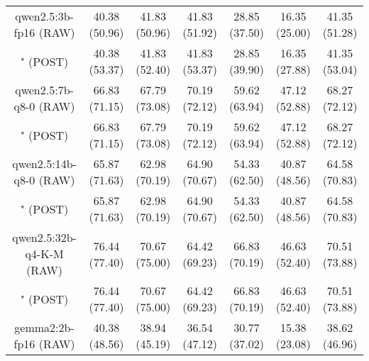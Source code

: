 \begin{table}[]
{\begin{tabular}{ccccccc}
        \multicolumn{1}{c|}{qwen2.5:3b-fp16 (RAW)} & 40.38 (50.96) & 41.83 (50.96) & \multicolumn{1}{c|}{41.83 (51.92)} & 28.85 (37.50) & \multicolumn{1}{c|}{16.35 (25.00)} & 41.35 (51.28) \\
        
        

        \multicolumn{1}{c|}{" (POST)} & 40.38 (53.37) & 41.83 (52.40) & \multicolumn{1}{c|}{41.83 (53.37)} & 28.85 (39.90) & \multicolumn{1}{c|}{16.35 (27.88)} & 41.35 (53.04) \\
        \cline{1-7}
        

        \multicolumn{1}{c|}{qwen2.5:7b-q8-0 (RAW)} & 66.83 (71.15) & 67.79 (73.08) & \multicolumn{1}{c|}{70.19 (72.12)} & 59.62 (63.94) & \multicolumn{1}{c|}{47.12 (52.88)} & 68.27 (72.12) \\
        
        

        \multicolumn{1}{c|}{" (POST)} & 66.83 (71.15) & 67.79 (73.08) & \multicolumn{1}{c|}{70.19 (72.12)} & 59.62 (63.94) & \multicolumn{1}{c|}{47.12 (52.88)} & 68.27 (72.12) \\
        \cline{1-7}
        

        \multicolumn{1}{c|}{qwen2.5:14b-q8-0 (RAW)} & 65.87 (71.63) & 62.98 (70.19) & \multicolumn{1}{c|}{64.90 (70.67)} & 54.33 (62.50) & \multicolumn{1}{c|}{40.87 (48.56)} & 64.58 (70.83) \\
        
        

        \multicolumn{1}{c|}{" (POST)} & 65.87 (71.63) & 62.98 (70.19) & \multicolumn{1}{c|}{64.90 (70.67)} & 54.33 (62.50) & \multicolumn{1}{c|}{40.87 (48.56)} & 64.58 (70.83) \\
        \cline{1-7}
        

        \multicolumn{1}{c|}{qwen2.5:32b-q4-K-M (RAW)} & 76.44 (77.40) & 70.67 (75.00) & \multicolumn{1}{c|}{64.42 (69.23)} & 66.83 (70.19) & \multicolumn{1}{c|}{46.63 (52.40)} & 70.51 (73.88) \\
        
        

        \multicolumn{1}{c|}{" (POST)} & 76.44 (77.40) & 70.67 (75.00) & \multicolumn{1}{c|}{64.42 (69.23)} & 66.83 (70.19) & \multicolumn{1}{c|}{46.63 (52.40)} & 70.51 (73.88) \\
        \cline{1-7}
        

        \multicolumn{1}{c|}{gemma2:2b-fp16 (RAW)} & 40.38 (48.56) & 38.94 (45.19) & \multicolumn{1}{c|}{36.54 (47.12)} & 30.77 (37.02) & \multicolumn{1}{c|}{15.38 (23.08)} & 38.62 (46.96) \\
        

\end{tabular}}
\end{table}
